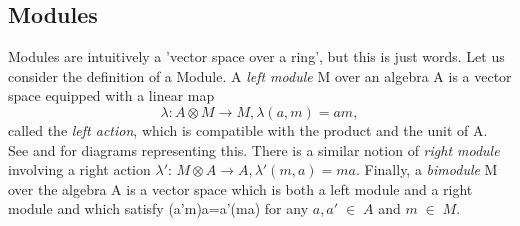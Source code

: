 \documentclass[preprint, 5p, 10pt]{elsarticle}
\theoremstyle{plain}
\begin{document}
\subsection{Modules}
Modules are intuitively a 'vector space over a ring', but this is just words. Let us consider the
definition of a Module. 
 A \textit{left module} M over an algebra A is a vector space equipped with a linear map
\begin{displaymath}
 \lambda: A \otimes M \rightarrow M, \lambda(a,m)=am,
\end{displaymath}
called the \textit{left action}, which is compatible with the product and the unit of A.
See \cite{AlgebraicOperads} and \cite{CategoryTheory} for diagrams representing this.
There is a similar notion of \textit{right module} involving a right action $\lambda'$:
$M \otimes A \rightarrow A, \lambda'(m,a) = ma.$ Finally, a \textit{bimodule} M over the algebra A
is a vector space which is both a left module and a right module and which satisfy (a'm)a=a'(ma) for any
$a,a'\;\in\;A$ and $m\;\in\;M.$
\end{document}
